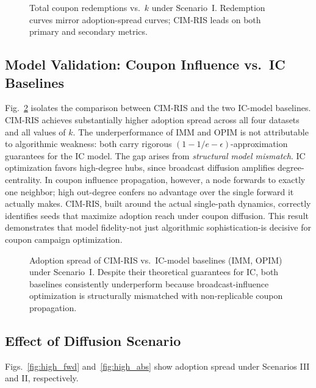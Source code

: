 \documentclass[sigconf]{acmart}
\newcommand{\CIMRIS}{\textsc{CIM-RIS}}
\begin{document}
\begin{figure}[t]
  \centering
  \caption{Total coupon redemptions vs.\ $k$ under Scenario~I.
    Redemption curves mirror adoption-spread curves; \CIMRIS{} leads
    on both primary and secondary metrics.}
  \label{fig:normal_redemp}
\end{figure}

\subsection{Model Validation: Coupon Influence vs.\ IC Baselines}
\label{sec:exp-ic}

Fig.~\ref{fig:ic_compare} isolates the comparison between \CIMRIS{} and
the two IC-model baselines.
\CIMRIS{} achieves substantially higher adoption spread across all four
datasets and all values of $k$.
The underperformance of IMM and OPIM is not attributable to algorithmic
weakness: both carry rigorous $(1{-}1/e{-}\epsilon)$-approximation
guarantees for the IC model.
The gap arises from \emph{structural model mismatch}.
IC optimization favors high-degree hubs, since broadcast diffusion
amplifies degree-centrality.
In coupon influence propagation, however, a node forwards to exactly one
neighbor; high out-degree confers no advantage over the single forward
it actually makes.
\CIMRIS{}, built around the actual single-path dynamics, correctly
identifies seeds that maximize adoption reach under coupon diffusion.
This result demonstrates that model fidelity-not just algorithmic
sophistication-is decisive for coupon campaign optimization.

\begin{figure}[t]
  \centering
  \caption{Adoption spread of \CIMRIS{} vs.\ IC-model baselines (IMM,
    OPIM) under Scenario~I.
    Despite their theoretical guarantees for IC, both baselines
    consistently underperform because broadcast-influence optimization
    is structurally mismatched with non-replicable coupon propagation.}
  \label{fig:ic_compare}
\end{figure}

\subsection{Effect of Diffusion Scenario}
\label{sec:exp-scenario}

Figs.~\ref{fig:high_fwd} and~\ref{fig:high_abs} show adoption spread
under Scenarios III and II, respectively.
\end{document}

